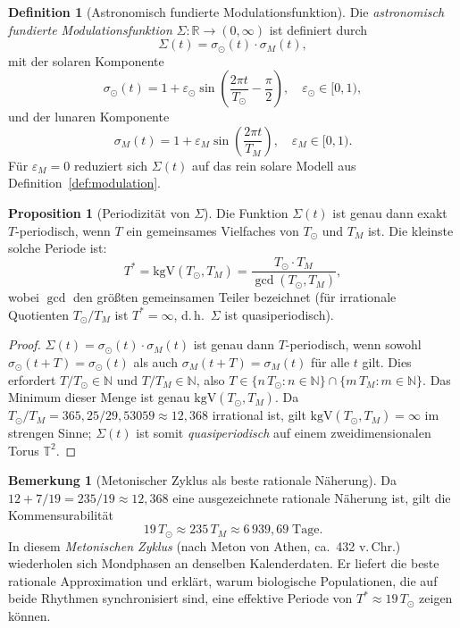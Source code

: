 ﻿\documentclass[12pt, a4paper]{article}
\theoremstyle{definition}
\newtheorem{proposition}[theorem]{Proposition}
\newtheorem{definition}[theorem]{Definition}
\newtheorem{bemerkung}[theorem]{Bemerkung}
\newcommand{\R}{\mathbb{R}}
\newcommand{\N}{\mathbb{N}}
\begin{document}
\begin{definition}[Astronomisch fundierte Modulationsfunktion]\label{def:sigma-astro}
Die \emph{astronomisch fundierte Modulationsfunktion} $\Sigma: \R \to (0,\infty)$
ist definiert durch
\begin{equation}\label{eq:sigma-astro}
  \Sigma(t) = \sigma_{\odot}(t)\cdot\sigma_M(t),
\end{equation}
mit der solaren Komponente
\[
  \sigma_{\odot}(t) = 1 + \varepsilon_{\odot}\sin\!\left(\frac{2\pi t}{T_{\odot}} - \frac{\pi}{2}\right),
  \quad \varepsilon_{\odot} \in [0,1),
\]
und der lunaren Komponente
\[
  \sigma_M(t) = 1 + \varepsilon_M \sin\!\left(\frac{2\pi t}{T_M}\right),
  \quad \varepsilon_M \in [0,1).
\]
Für $\varepsilon_M = 0$ reduziert sich $\Sigma(t)$ auf das rein solare Modell
aus Definition~\ref{def:modulation}.
\end{definition}

\begin{proposition}[Periodizität von $\Sigma$]\label{prop:sigma-periode}
Die Funktion $\Sigma(t)$ ist genau dann exakt $T$-periodisch, wenn $T$ ein
gemeinsames Vielfaches von $T_{\odot}$ und $T_M$ ist. Die kleinste solche
Periode ist:
\begin{equation}\label{eq:LCM}
  T^* = \mathrm{kgV}(T_{\odot}, T_M) = \frac{T_{\odot}\cdot T_M}{\gcd(T_{\odot}, T_M)},
\end{equation}
wobei $\gcd$ den größten gemeinsamen Teiler bezeichnet (für irrationale Quotienten
$T_{\odot}/T_M$ ist $T^* = \infty$, d.\,h.\ $\Sigma$ ist quasiperiodisch).
\end{proposition}

\begin{proof}
$\Sigma(t) = \sigma_{\odot}(t)\cdot\sigma_M(t)$ ist genau dann $T$-periodisch, wenn
sowohl $\sigma_{\odot}(t+T) = \sigma_{\odot}(t)$ als auch $\sigma_M(t+T) = \sigma_M(t)$
für alle $t$ gilt. Dies erfordert $T/T_{\odot} \in \N$ und $T/T_M \in \N$, also
$T \in \{n\,T_{\odot} : n \in \N\} \cap \{m\,T_M : m \in \N\}$. Das Minimum dieser
Menge ist genau $\mathrm{kgV}(T_{\odot}, T_M)$. Da $T_{\odot}/T_M = 365{,}25/29{,}53059
\approx 12{,}368$ irrational ist, gilt $\mathrm{kgV}(T_{\odot},T_M) = \infty$ im
strengen Sinne; $\Sigma(t)$ ist somit \emph{quasiperiodisch} auf einem
zweidimensionalen Torus $\mathbb{T}^2$. \hfill
\end{proof}

\begin{bemerkung}[Metonischer Zyklus als beste rationale Näherung]
Da $12 + 7/19 = 235/19 \approx 12{,}368$ eine ausgezeichnete rationale Näherung
ist, gilt die Kommensurabilität
\[
  19\,T_{\odot} \approx 235\,T_M \approx 6\,939{,}69\;\text{Tage}.
\]
In diesem \emph{Metonischen Zyklus} (nach Meton von Athen, ca.\ 432 v.\,Chr.)
wiederholen sich Mondphasen an denselben Kalenderdaten. Er liefert die beste
rationale Approximation und erklärt, warum biologische Populationen,
die auf beide Rhythmen synchronisiert sind, eine effektive Periode von
$T^* \approx 19\,T_{\odot}$ zeigen können.
\end{bemerkung}
\end{document}

